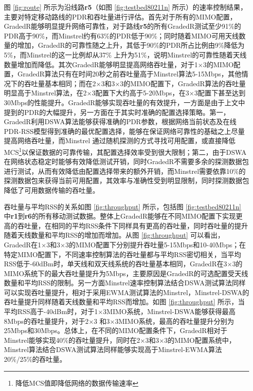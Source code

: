 图 \ref{fig:route} 所示为沿线路\textbf{r5}（如图 \ref{fig:testbed80211n} 所示）的速率控制结果，主要对特定移动路线的PDR和吞吐量进行评估。首先对于所有的MIMO配置，GradedR能够明显提升网络可靠性，对于路线\textbf{r5}的所有GradedR测试至少91\%的PDR高于90\%，而Minstrel约有63\%的PDR低于90\%；同时随着MIMO可用天线数量的增加，GradedR的可靠性随之上升，其低于90\%的PDR所占比例由9\%降低为5\%，而Minstrel的这一比例却从37\% 上升为51\%，说明Minstrel的可靠性随着天线数量增加而降低。其次GradedR能够明显提高网络吞吐量，对于1$\times$3的MIMO配置，GradedR算法只有在时间20秒之前吞吐量高于Minstrel算法5-15Mbps，其他情况下的吞吐量基本相同；而在2$\times$3和3$\times$3的MIMO配置下，GradedR算法的吞吐量明显高于Minstrel算法，在2$\times$3配置下大约高于5-20Mbps，在3$\times$3配置下甚至达到30Mbps的性能提升。GradedR能够实现吞吐量的有效提升，一方面是由于上文中提到的PDR的大幅提升，另一方面在于其实时准确的配置选择策略。第一，GradedR利用DSWA算法能够获得准确的PDR参数，根据网络当前状态及在线PDR-RSS模型得到准确的最优配置选择，能够在保证网络可靠性的基础之上尽量提高网络吞吐量，而Minstrel 通过随机探测的方式寻找可用配置，或直接降低MCS\footnote{降低MCS值即降低网络的数据传输速率}以保证数据的可靠传输，其配置选择效率受到很大限制；第二，由于DSWA在网络状态稳定时能够有效降低测试开销，同时GradedR不需要多余的探测数据包进行测试，从而有效降低由配置选择带来的额外开销，而Minstrel需要依靠10\%的探测数据包来获得当前可用配置，其效率与准确性受到明显限制，同时探测数据包降低了可用数据传输的吞吐量。

吞吐量与平均RSS的关系如图 \ref{fig:throughput} 所示，包括图 \ref{fig:testbed80211n} 中\textbf{r1}到\textbf{r6}的所有移动测试数据。整体上GradedR能够在不同MIMO配置下实现更高的吞吐量，在相同的平均RSS条件下同样具有更高的吞吐量，同时吞吐量的提升随着天线数量和平均RSS的增加而增加。从图 \ref{fig:throughput} 可以看出，GradedR在1$\times$3和3$\times$3的MIMO配置下分别提升吞吐量5-15Mbps和10-40Mbps；在特定MIMO配置下，不同速率控制算法的吞吐量都与平均RSS密切相关，当平均RSS低于-60dBm时，单天线和双天线系统的吞吐量基本相同，GradedR在3$\times$3的MIMO系统下的最大吞吐量提升为5Mbps，主要原因是GradedR的可选配置受天线数量和平均RSS的限制。另一方面Minstrel速率控制算法结合DSWA测试算法同样可以实现吞吐量提升，相对于采用EWMA测试算法的Minstrel，Minstrel-DSWA的吞吐量提升同样随着天线数量和平均RSS而增加。如图 \ref{fig:throughput} 所示，当平均RSS高于-40dBm时，对于1$\times$3MIMO系统，Minstrel-DSWA能够获得最高8Mbps的吞吐量提升，对于2$\times$3 和3$\times$3MIMO系统，最高的吞吐量提升分别为25Mbps和30Mbps。总体上，在不同的MIMO配置条件下，GradedR相对于Minstrel能够实现40\%的吞吐量提升，同时在2$\times$3和3$\times$3的MIMO配置系统中，Minstrel算法结合DSWA测试算法同样能够实现高于Minstrel-EWMA算法20\%/25\%的吞吐量。


